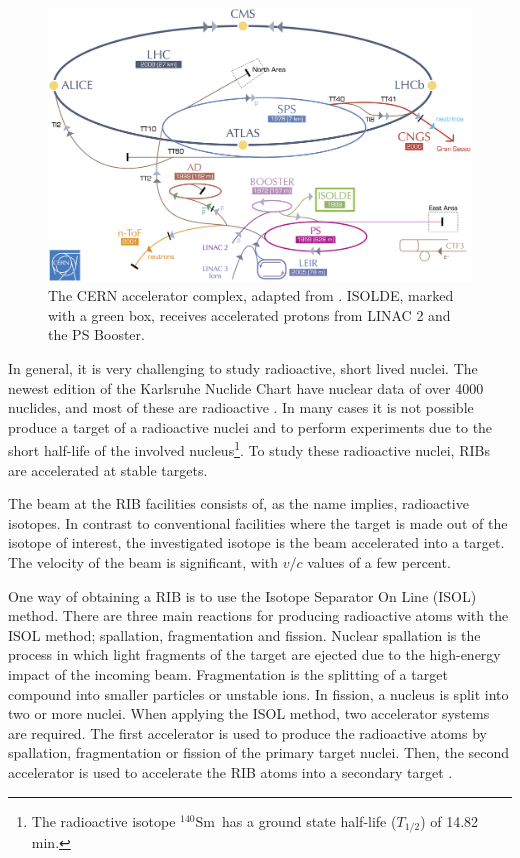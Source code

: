 \documentclass[twoside,english]{uiofysmaster/uiofysmaster}
\newcommand{\Sm}{$^{140}$Sm} %
\begin{document}
\begin{figure}[ht]
	\centering
	\includegraphics[width=\textwidth]{Images/CERN-accelerators.png}
	\caption{The CERN accelerator complex, adapted from \cite{CERN-AC}. ISOLDE, marked with a green box, receives accelerated protons from LINAC 2 and the PS Booster.}
	\label{fig:accelerators}
\end{figure}

In general, it is very challenging to study radioactive, short lived nuclei. 
The newest edition of the Karlsruhe Nuclide Chart have nuclear data of over 4000 nuclides, and most of these are radioactive \cite{CoN}. 
In many cases it is not possible produce a target of a radioactive nuclei and to perform experiments due to the short half-life of the involved nucleus\footnote{The radioactive isotope \Sm\ has a ground state half-life ($T_{1/2}$) of 14.82 min.}. 
To study these radioactive nuclei, RIBs are accelerated at stable targets. 

The beam at the RIB facilities consists of, as the name implies, radioactive isotopes. 
In contrast to conventional facilities where the target is made out of the isotope of interest, the investigated isotope is the beam accelerated into a target.
The velocity of the beam is significant, with $v/c$ values of a few percent. 

One way of obtaining a RIB is to use the Isotope Separator On Line (ISOL) method. 
There are three main reactions for producing radioactive atoms with the ISOL method; spallation, fragmentation and fission. 
Nuclear spallation is the process in which light fragments of the target are ejected due to the high-energy impact of the incoming beam. 
Fragmentation is the splitting of a target compound into smaller particles or unstable ions. 
In fission, a nucleus is split into two or more nuclei.
When applying the ISOL method, two accelerator systems are required. 
The first accelerator is used to produce the radioactive atoms by spallation, fragmentation or fission of the primary target nuclei. 
Then, the second accelerator is used to accelerate the RIB atoms into a secondary target \cite{ISOLDE-web, Lindroos, ISOL}. 
\end{document}
